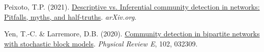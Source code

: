 \documentclass[
]{article}
\newlength{\cslhangindent}
\newlength{\cslentryspacingunit} %
\newenvironment{CSLReferences}[2] %
 {%
  \setlength{\parindent}{0pt}
  \ifodd #1
  \let\oldpar\par
  \def\par{\hangindent=\cslhangindent\oldpar}
  \fi
  \setlength{\parskip}{#2\cslentryspacingunit}
 }%
 {}
\begin{document}
\begin{CSLReferences}{1}{0}
\leavevmode{}%
Peixoto, T.P. (2021).
\href{https://doi.org/10.1017/9781009118897}{Descriptive vs. Inferential
community detection in networks: Pitfalls, myths, and half-truths}.
\emph{arXiv.org}.

\leavevmode{}%
Yen, T.-C. \& Larremore, D.B. (2020).
\href{https://doi.org/10.1103/PhysRevE.102.032309}{Community detection
in bipartite networks with stochastic block models}. \emph{Physical
Review E}, 102, 032309.

\end{CSLReferences}
\end{document}
